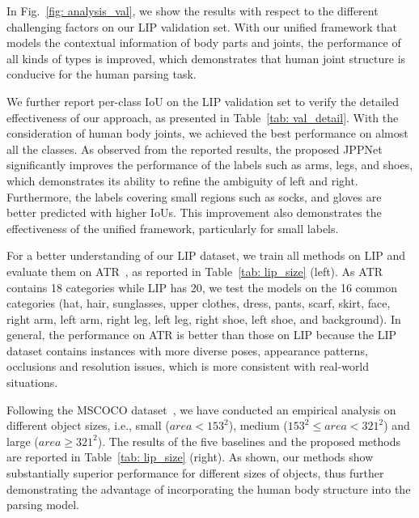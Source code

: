\documentclass[10pt,journal,compsoc]{IEEEtran}
\begin{document}
In Fig.~\ref{fig: analysis_val}, we show the results with respect to the different challenging factors on our LIP validation set. With our unified framework that models the contextual information of body parts and joints, the performance of all kinds of types is improved, which demonstrates that human joint structure is conducive for the human parsing task.

We further report per-class IoU on the LIP validation set to verify the detailed effectiveness of our approach, as presented in Table~\ref{tab: val_detail}. With the consideration of human body joints, we achieved the best performance on almost all the classes. As observed from the reported results, the proposed JPPNet significantly improves the performance of the labels such as arms, legs, and shoes, which demonstrates its ability to refine the ambiguity of left and right. Furthermore, the labels covering small regions such as socks, and gloves are better predicted with higher IoUs. This improvement also demonstrates the effectiveness of the unified framework, particularly for small labels.

For a better understanding of our LIP dataset, {we train all methods on LIP and evaluate them on ATR~\cite{Co-CNN}, as reported in Table~\ref{tab: lip_size} (left). As ATR contains 18 categories while LIP has 20, we test the models on the 16 common categories (hat, hair, sunglasses, upper clothes, dress, pants, scarf, skirt, face, right arm, left arm, right leg, left leg, right shoe, left shoe, and background). } In general, the performance on ATR is better than those on LIP because the LIP dataset contains instances with more diverse poses, appearance patterns, occlusions and resolution issues, which is more consistent with real-world situations. 

Following the MSCOCO dataset~\cite{DBLP:journals/corr/LinMBHPRDZ14}, we have conducted an empirical analysis on different object sizes, i.e., small ($area < 153^2$), medium ($153^2 \leq area < 321^2$) and large ($area \geq 321^2$). The results of the five baselines and the proposed methods are reported in Table~\ref{tab: lip_size} (right). As shown, our methods show substantially superior performance for different sizes of objects, thus further demonstrating the advantage of incorporating the human body structure into the parsing model.
\end{document}
